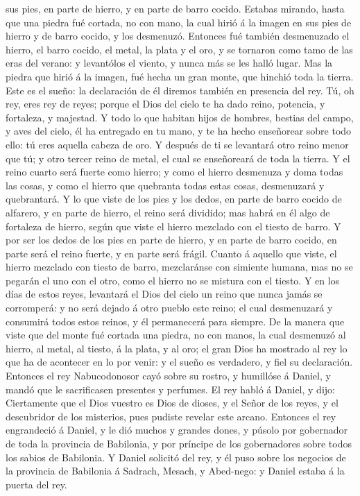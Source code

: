 sus pies, en parte de hierro, y en parte de barro cocido.
 Estabas mirando, hasta que una piedra fué cortada, no
con mano, la cual hirió á la imagen en sus pies de hierro y de barro
cocido, y los desmenuzó.  Entonces fué también
desmenuzado el hierro, el barro cocido, el metal, la plata y el oro, y
se tornaron como tamo de las eras del verano: y levantólos el viento, y
nunca más se les halló lugar. Mas la piedra que hirió á la imagen, fué
hecha un gran monte, que hinchió toda la tierra.  Este es
el sueño: la declaración de él diremos también en presencia del rey.
 Tú, oh rey, eres rey de reyes; porque el Dios del cielo
te ha dado reino, potencia, y fortaleza, y majestad.  Y
todo lo que habitan hijos de hombres, bestias del campo, y aves del
cielo, él ha entregado en tu mano, y te ha hecho enseñorear sobre todo
ello: tú eres aquella cabeza de oro.  Y después de ti se
levantará otro reino menor que tú; y otro tercer reino de metal, el cual
se enseñoreará de toda la tierra.  Y el reino cuarto será
fuerte como hierro; y como el hierro desmenuza y doma todas las cosas, y
como el hierro que quebranta todas estas cosas, desmenuzará y
quebrantará.  Y lo que viste de los pies y los dedos, en
parte de barro cocido de alfarero, y en parte de hierro, el reino será
dividido; mas habrá en él algo de fortaleza de hierro, según que viste
el hierro mezclado con el tiesto de barro.  Y por ser los
dedos de los pies en parte de hierro, y en parte de barro cocido, en
parte será el reino fuerte, y en parte será frágil. 
Cuanto á aquello que viste, el hierro mezclado con tiesto de barro,
mezclaránse con simiente humana, mas no se pegarán el uno con el otro,
como el hierro no se mistura con el tiesto.  Y en los
días de estos reyes, levantará el Dios del cielo un reino que nunca
jamás se corromperá: y no será dejado á otro pueblo este reino; el cual
desmenuzará y consumirá todos estos reinos, y él permanecerá para
siempre.  De la manera que viste que del monte fué
cortada una piedra, no con manos, la cual desmenuzó al hierro, al metal,
al tiesto, á la plata, y al oro; el gran Dios ha mostrado al rey lo que
ha de acontecer en lo por venir: y el sueño es verdadero, y fiel su
declaración.  Entonces el rey Nabucodonosor cayó sobre su
rostro, y humillóse á Daniel, y mandó que le sacrificasen presentes y
perfumes.  El rey habló á Daniel, y dijo: Ciertamente que
el Dios vuestro es Dios de dioses, y el Señor de los reyes, y el
descubridor de los misterios, pues pudiste revelar este arcano.
 Entonces el rey engrandeció á Daniel, y le dió muchos y
grandes dones, y púsolo por gobernador de toda la provincia de
Babilonia, y por príncipe de los gobernadores sobre todos los sabios de
Babilonia.  Y Daniel solicitó del rey, y él puso sobre
los negocios de la provincia de Babilonia á Sadrach, Mesach, y
Abed-nego: y Daniel estaba á la puerta del rey.


